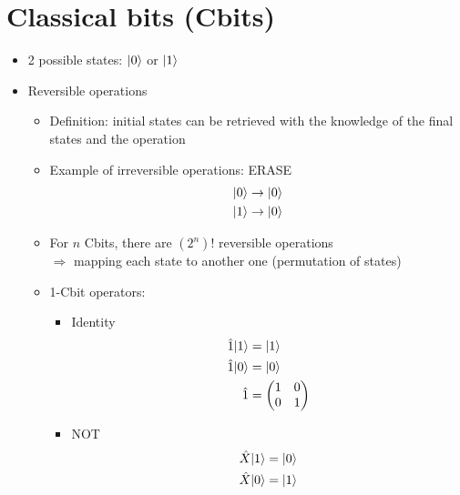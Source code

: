\documentclass{../doc}
\begin{document}

  \section{Classical bits (Cbits)}
    \begin{itemize}
      \item 2 possible states: $| 0 \rangle$ or $| 1 \rangle$
      \item Reversible operations
        \begin{itemize}
          \item Definition: initial states can be retrieved with the knowledge of the final states and the operation
          \item Example of irreversible operations: ERASE
            \begin{align}
              | 0 \rangle &\to | 0 \rangle \\
              | 1 \rangle &\to | 0 \rangle
            \end{align}
          \item For $n$ Cbits, there are $(2^n)!$ reversible operations \\
            $\Rightarrow$ mapping each state to another one (permutation of states)
          \item 1-Cbit operators:
            \begin{itemize}
              \item Identity
                \begin{align}
                  \hat 1 | 1 \rangle &= | 1 \rangle \\
                  \hat 1 | 0 \rangle &= | 0 \rangle \\
                  \hat 1 &= \begin{pmatrix}
                    1 & 0 \\
                    0 & 1
                  \end{pmatrix}
                \end{align}
              \item NOT
                \begin{align}
                  \hat X \ket{1} &= \ket{0} \\
                  \hat X \ket{0} &= \ket{1} \\

\end{align}
\end{itemize}
\end{itemize}
\end{itemize}
\end{document}
